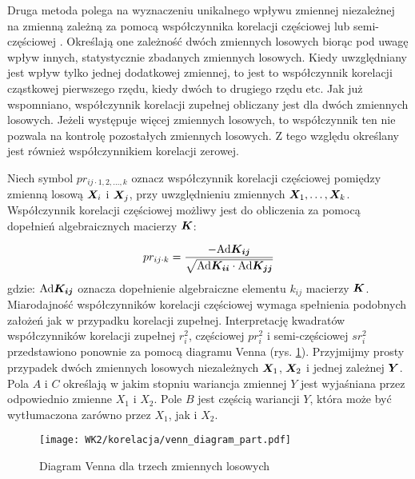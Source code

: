 \begin{appendices}
Druga metoda polega na wyznaczeniu unikalnego wpływu zmiennej niezależnej na zmienną zależną za pomocą współczynnika korelacji częściowej  lub semi-częściowej . Określają one zależność dwóch zmiennych losowych biorąc pod uwagę wpływ innych, statystycznie zbadanych zmiennych losowych. Kiedy uwzględniany jest wpływ tylko jednej dodatkowej zmiennej, to jest to współczynnik korelacji cząstkowej pierwszego rzędu, kiedy dwóch to drugiego rzędu etc. Jak już wspomniano, współczynnik korelacji zupełnej obliczany jest dla dwóch zmiennych losowych. Jeżeli występuje więcej zmiennych losowych, to współczynnik ten nie pozwala na kontrolę pozostałych zmiennych losowych. Z tego względu określany jest również współczynnikiem korelacji zerowej. 

Niech symbol $pr_{ij\cdot 1,2,\dots,k}$ oznacz współczynnik korelacji częściowej pomiędzy zmienną losową $\bm{X}_i$ i $\bm{X}_j$, przy uwzględnieniu zmiennych $\bm{X}_1,\dots,\bm{X}_k$. Współczynnik korelacji częściowej możliwy jest do obliczenia za pomocą dopełnień algebraicznych macierzy $\bm{K}$:

\begin{equation}
		pr_{ij\cdot k} = \frac{-\mathrm{Ad}\bm{K_{ij}}}{\sqrt{\mathrm{Ad}\bm{K_{ii}}\cdot\mathrm{Ad}\bm{K_{jj}}}}
\end{equation}
gdzie: $\mathrm{Ad}\bm{K_{ij}}$ oznacza dopełnienie algebraiczne elementu $k_{ij}$ macierzy $\bm{K}$. Miarodajność współczynników korelacji częściowej wymaga spełnienia podobnych założeń jak w przypadku korelacji zupełnej.
\clearpage
Interpretację kwadratów współczynników korelacji zupełnej $r_i^2$, częściowej $pr_i^2$ i semi-częściowej $sr_i^2$ przedstawiono ponownie za pomocą diagramu Venna (rys. \ref{fig:venn_diag_part_corr}). Przyjmijmy prosty przypadek dwóch zmiennych losowych niezależnych $\bm{X}_1$, $\bm{X}_2$ i jednej zależnej $\bm{Y}$. Pola $A$ i $C$ określają w jakim stopniu wariancja zmiennej $Y$ jest wyjaśniana przez odpowiednio zmienne $X_1$ i $X_2$. Pole $B$ jest częścią wariancji $Y$, która może być wytłumaczona zarówno przez $X_1$, jak i $X_2$.

\begin{figure}[hbt!]
	\centering
	\texttt{[image: WK2/korelacja/venn\_diagram\_part.pdf]}
	\captionsetup{justification=centering}
	\caption{Diagram Venna dla trzech zmiennych losowych}
	\label{fig:venn_diag_part_corr}
\end{figure}


\end{appendices}
